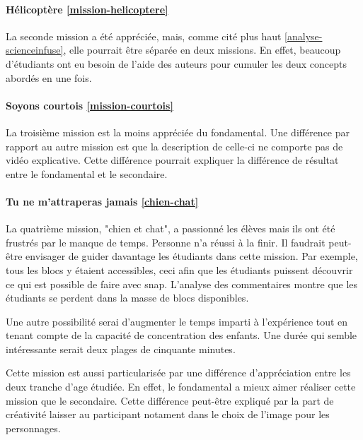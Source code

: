 \paragraph{Hélicoptère \ref{mission-helicoptere}}
La seconde mission a été appréciée, mais, comme cité plus haut \ref{analyse-scienceinfuse}, elle pourrait être séparée en deux missions. En effet, beaucoup d'étudiants ont eu besoin de l'aide des auteurs pour cumuler les deux concepts abordés en une fois.

\paragraph{Soyons courtois \ref{mission-courtois}}
La troisième mission est la moins appréciée du fondamental. Une différence par rapport au autre mission est que la description de celle-ci ne comporte pas de vidéo explicative. Cette différence pourrait expliquer la différence de résultat entre le fondamental et le secondaire.

\paragraph{Tu ne m'attraperas jamais \ref{chien-chat}}
La quatrième mission, "chien et chat", a passionné les élèves mais ils ont été frustrés par le manque de temps. Personne n'a réussi à la finir. Il faudrait peut-être envisager de guider davantage les étudiants dans cette mission. Par exemple, tous les \glspl{bloc} y étaient accessibles, ceci afin que les étudiants puissent découvrir ce qui est possible de faire avec \gls{snap}. L'analyse des commentaires montre que les étudiants se perdent dans la masse de \glspl{bloc} disponibles.

Une autre possibilité serai d'augmenter le temps imparti à l'expérience tout en tenant compte de la capacité de concentration des enfants. Une durée qui semble intéressante serait deux plages de cinquante minutes.

Cette mission est aussi particularisée par une différence d'appréciation entre les deux tranche d'age étudiée. En effet, le fondamental a mieux aimer réaliser cette mission que le secondaire. Cette différence peut-être expliqué par la part de créativité laisser au participant notament dans le choix de l'image pour les personnages.

